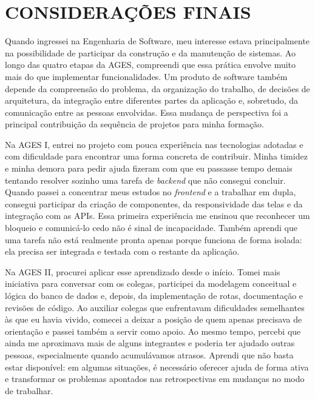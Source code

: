 \chapter[Considerações Finais]{CONSIDERAÇÕES FINAIS}

Quando ingressei na Engenharia de Software, meu interesse estava principalmente
na possibilidade de participar da construção e da manutenção de sistemas. Ao
longo das quatro etapas da AGES, compreendi que essa prática envolve muito
mais do que implementar funcionalidades. Um produto de software também depende
da compreensão do problema, da organização do trabalho, de decisões de
arquitetura, da integração entre diferentes partes da aplicação e, sobretudo,
da comunicação entre as pessoas envolvidas. Essa mudança de perspectiva foi a
principal contribuição da sequência de projetos para minha formação.

Na AGES I, entrei no projeto com pouca experiência nas tecnologias adotadas e
com dificuldade para encontrar uma forma concreta de contribuir. Minha timidez
e minha demora para pedir ajuda fizeram com que eu passasse tempo demais tentando
resolver sozinho uma tarefa de \textit{backend} que não consegui concluir. Quando
passei a concentrar meus estudos no \textit{frontend} e a trabalhar em dupla,
consegui participar da criação de componentes, da responsividade das telas e da
integração com as APIs. Essa primeira experiência me ensinou que reconhecer
um bloqueio e comunicá-lo cedo não é sinal de incapacidade. Também aprendi que
uma tarefa não está realmente pronta apenas porque funciona de forma isolada:
ela precisa ser integrada e testada com o restante da aplicação.

Na AGES II, procurei aplicar esse aprendizado desde o início. Tomei mais
iniciativa para conversar com os colegas, participei da modelagem conceitual e
lógica do banco de dados e, depois, da implementação de rotas, documentação e
revisões de código. Ao auxiliar colegas que enfrentavam dificuldades semelhantes
às que eu havia vivido, comecei a deixar a posição de quem apenas precisava de
orientação e passei também a servir como apoio. Ao mesmo tempo, percebi que ainda
me aproximava mais de alguns integrantes e poderia ter ajudado outras pessoas,
especialmente quando acumulávamos atrasos. Aprendi que não basta
estar disponível: em algumas situações, é necessário oferecer ajuda de forma
ativa e transformar os problemas apontados nas retrospectivas em mudanças no
modo de trabalhar.

